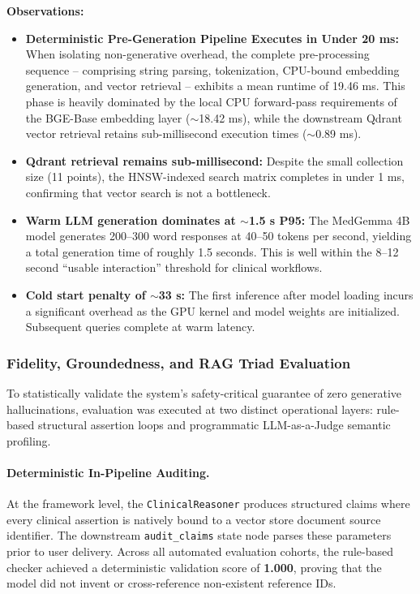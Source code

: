 \textbf{Observations:}
\begin{itemize}
    \item \textbf{Deterministic Pre-Generation Pipeline Executes in Under 20 ms:} When isolating non-generative overhead, the complete pre-processing sequence -- comprising string parsing, tokenization, CPU-bound embedding generation, and vector retrieval -- exhibits a mean runtime of 19.46 ms. This phase is heavily dominated by the local CPU forward-pass requirements of the BGE-Base embedding layer ($\sim$18.42 ms), while the downstream Qdrant vector retrieval retains sub-millisecond execution times ($\sim$0.89 ms).
    \item \textbf{Qdrant retrieval remains sub-millisecond:} Despite the small collection size (11 points), the HNSW-indexed search matrix completes in under 1 ms, confirming that vector search is not a bottleneck.
    \item \textbf{Warm LLM generation dominates at $\sim$1.5 s P95:} The MedGemma 4B model generates 200--300 word responses at 40--50 tokens per second, yielding a total generation time of roughly 1.5 seconds. This is well within the 8--12 second ``usable interaction'' threshold for clinical workflows.
    \item \textbf{Cold start penalty of $\sim$33 s:} The first inference after model loading incurs a significant overhead as the GPU kernel and model weights are initialized. Subsequent queries complete at warm latency.
\end{itemize}


\subsubsection{Fidelity, Groundedness, and RAG Triad Evaluation}
To statistically validate the system's safety-critical guarantee of zero generative hallucinations, evaluation was executed at two distinct operational layers: rule-based structural assertion loops and programmatic LLM-as-a-Judge semantic profiling.

\paragraph{Deterministic In-Pipeline Auditing.} At the framework level, the \texttt{ClinicalReasoner} produces structured claims where every clinical assertion is natively bound to a vector store document source identifier. The downstream \texttt{audit\_claims} state node parses these parameters prior to user delivery. Across all automated evaluation cohorts, the rule-based checker achieved a deterministic validation score of \textbf{1.000}, proving that the model did not invent or cross-reference non-existent reference IDs.

